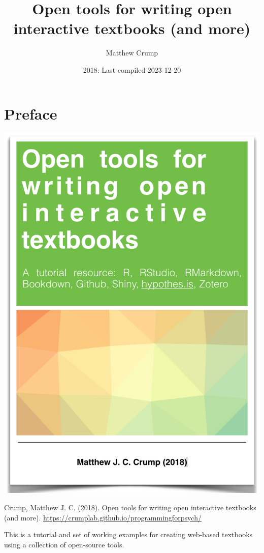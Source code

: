 \documentclass[
]{book}
\title{Open tools for writing open interactive textbooks (and more)}
\author{Matthew Crump}
\date{2018: Last compiled 2023-12-20}
\begin{document}
\maketitle

{
\setcounter{tocdepth}{1}
\tableofcontents
}
\hypertarget{preface}{%
\chapter*{Preface}\label{preface}}

\begin{center}\includegraphics{OER} \end{center}

Crump, Matthew J. C. (2018). Open tools for writing open interactive textbooks (and more). \url{https://crumplab.github.io/programmingforpsych/}

This is a tutorial and set of working examples for creating web-based textbooks using a collection of open-source tools.
\end{document}
